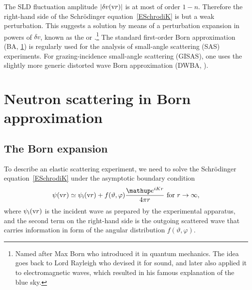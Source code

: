 The SLD fluctuation amplitude $|\delta v(\text{v}{r})|$ is at most of order $1-n$.
Therefore the right-hand side of the Schrödinger equation~\cref{ESchrodiK}
is but a weak perturbation.
This suggests a solution
by means of a perturbation expansion in powers of $\delta v$,
%
known as the  or .\footnote{
Named after Max Born
who introduced it in quantum mechanics.
The idea goes back to Lord Rayleigh
who devised it for sound,
and later also applied it to electromagnetic waves,
which resulted in his famous explanation of the blue sky.}
The standard first-order Born approximation (BA, \cref{SBornApprox})
is regularly used  for the analysis of small-angle scattering (SAS) experiments.
%
%
%
For grazing-incidence small-angle scattering (GISAS),
one uses the slightly more generic distorted wave Born approximation (DWBA, ).
%

%
%

\section{Neutron scattering in Born approximation}\label{SBornApprox}

\subsection{The Born expansion}\label{SBornExpans}

%
%

To describe an elastic scattering experiment,
we need to solve the Schrödinger equation~\cref{ESchrodiK}
under the asymptotic boundary condition
%
\begin{equation}\label{Escabouco}
  \psi(\r)
  \simeq \psi_\si(\r) + f(\vartheta,\varphi)\frac{\e^{iKr}}{4\pi r}
  \text{~for~}r\to\infty,
\end{equation}
%
%
%
where $\psi_{\text{i}}(\text{v}{r})$ is the incident wave
as prepared by the experimental apparatus,
and the second term on the right-hand side is
the outgoing scattered wave
that carries information in form of the angular distribution
$f(\vartheta,\varphi)$.

